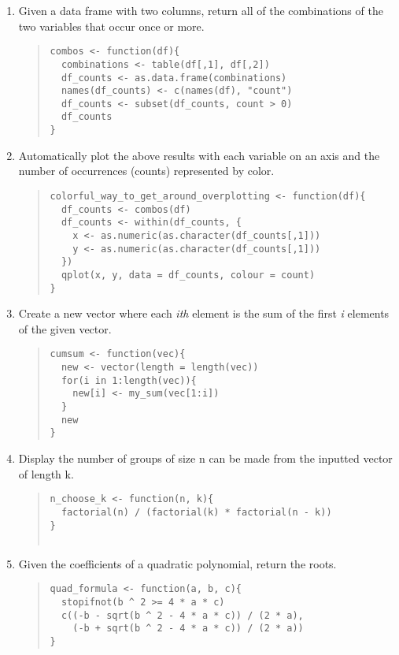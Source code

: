 \documentclass{article}
\begin{document}
\begin{enumerate}
\item Given a data frame with two columns, return all of the combinations of the two variables that occur once or more.
  \begin{quote}
    \begin{verbatim}
combos <- function(df){
  combinations <- table(df[,1], df[,2])
  df_counts <- as.data.frame(combinations)
  names(df_counts) <- c(names(df), "count")
  df_counts <- subset(df_counts, count > 0)
  df_counts
}    
    \end{verbatim}
  \end{quote}

\item Automatically plot the above results with each variable on an axis and the number of occurrences (counts) represented by color.
  \begin{quote}
    \begin{verbatim}
colorful_way_to_get_around_overplotting <- function(df){
  df_counts <- combos(df)
  df_counts <- within(df_counts, {
    x <- as.numeric(as.character(df_counts[,1]))
    y <- as.numeric(as.character(df_counts[,1]))
  })
  qplot(x, y, data = df_counts, colour = count)
}     
    \end{verbatim}
  \end{quote}

\item Create a new vector where each \emph{ith} element is the sum of the first \emph{i} elements of the given vector.
  \begin{quote}
    \begin{verbatim}
cumsum <- function(vec){
  new <- vector(length = length(vec))
  for(i in 1:length(vec)){
  	new[i] <- my_sum(vec[1:i])
  }
  new
}
    \end{verbatim}
  \end{quote}

\item Display the number of groups of size n can be made from the inputted vector of length k.
  \begin{quote}
    \begin{verbatim}
n_choose_k <- function(n, k){
  factorial(n) / (factorial(k) * factorial(n - k))
}
    
    \end{verbatim}
  \end{quote}

\item Given the coefficients of a quadratic polynomial, return the roots.
  \begin{quote}
    \begin{verbatim}
quad_formula <- function(a, b, c){
  stopifnot(b ^ 2 >= 4 * a * c)
  c((-b - sqrt(b ^ 2 - 4 * a * c)) / (2 * a),
    (-b + sqrt(b ^ 2 - 4 * a * c)) / (2 * a))
}    
    \end{verbatim}
  \end{quote}


\end{enumerate}
\end{document}
